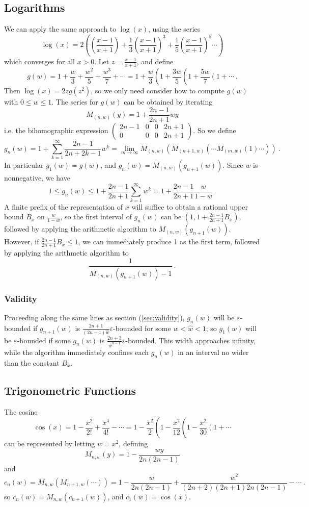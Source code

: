 \documentclass[11pt, oneside]{amsart}   	%
\newcommand{\bihomographic}[8]{\left(\begin{smallmatrix}#1&#2&#3&#4\\#5&#6&#7&#8\end{smallmatrix}\right)}
\renewcommand{\:}{\negthickspace:\negthickspace}
\begin{document}
\subsection{Logarithms} We can apply the same approach to $\log(x)$, using the series
\[
\log (x) =  2 \left( \left(\frac{x-1}{x+1}\right) + \frac{1}{3}\left(\frac{x-1}{x+1}\right)^3 + \frac{1}{5}\left(\frac{x-1}{x+1}\right)^5 \cdots \right)
\]
which converges for all $x > 0$. Let $z=\frac{x-1}{x+1}$, and define
\[
g(w) = 1 + \frac{w}{3} + \frac{w^2}{5} + \frac{w^3}{7} + \cdots = 1 + \frac{w}{3}\left(1 + \frac{3w}{5}\left(1 + \frac{5w}{7}\left(1 +\cdots \right. \right. \right.\ .
\]
Then $\log(x) = 2zg(z^2)$, so we only need consider how to compute $g(w)$ with $0 \leq w \leq 1$.
The series for $g(w)$ can be obtained by iterating
\[
M_{(n,w)}(y) = 1 + \frac{2n-1}{2n+1}wy 
\]
i.e. the bihomographic expression $\bihomographic{2n-1}{0}{0}{2n+1}{0}{0}{0}{2n+1}$.
So we define
\[
g_n(w) = 1  + \sum_{k=1}^{\infty}\frac{2n-1}{2n+2k-1}w^k= \lim_{m\to\infty} M_{(n,w)}( M_{(n+1,w)}( \cdots M_{(m,w)}(1) \cdots ) ) \ .
\]
In particular $g_1(w) = g(w)$, and $g_n(w) = M_{(n,w)}(g_{n+1}(w))$. Since $w$ is nonnegative, we have
\begin{equation}\label{eq:logbound}
1 \leq g_n(w) \leq 1 + \frac{2n-1}{2n+1}\sum_{k=1}^{\infty} w^k = 1+\frac{2n-1}{2n+1}\frac{w}{1-w}\ .
\end{equation}
A finite prefix of the representation of $x$ will suffice to obtain a rational upper bound $B_x$ on $\frac{w}{1-w}$, so the first interval of $g_n(w)$ can be $(1, 1+\frac{2n-1}{2n+1}B_x)$, followed by applying the arithmetic algorithm to $M_{(n,w)}(g_{n+1}(w))$. However, if $\frac{2n-1}{2n+1}B_x \leq 1$, we can immediately produce 1 as the first term, followed by applying the
arithmetic algorithm to
\[
\frac{1}{M_{(n,w)}(g_{n+1}(w)) - 1}\ .
\]

\subsubsection{Validity} Proceeding along the same lines as section (\ref{sec:validity}), $g_n(w)$ will be $\varepsilon$-bounded if
$g_{n+1}(w)$ is $\frac{2n+1}{(2n-1)\hat{w}}\varepsilon$-bounded for some $w < \hat{w} < 1$; so $g_1(w)$ will be $\varepsilon$-bounded if some $g_n(w)$ is
$\frac{2n+3}{\hat{w}^{n-1}}\varepsilon$-bounded. This width approaches infinity,
while the algorithm immediately confines each $g_n(w)$ in an interval no wider than the constant $B_x$.


\subsection{Trigonometric Functions}
The cosine
\[
\cos(x) = 1 - \frac{x^2}{2!} + \frac{x^4}{4!} - \cdots = 1 - \frac{x^2}{2} \left(1 - \frac{x^2}{12}\left( 1 - \frac{x^2}{30}\left(1 + \cdots \right. \right.  \right.  
\]
can be represented by letting $w=x^2$, defining
\[
M_{n,w}(y) = 1 - \frac{wy}{2n(2n-1)}
\]
and
\begin{equation}\label{eq:cosIter}
c_n(w) = M_{n,w}(M_{n+1,w}(\cdots)) = 1 - \frac{w}{2n(2n-1)} + \frac{w^2}{(2n+2)(2n+1)2n(2n-1)} - \cdots \ .
\end{equation}
so $c_n(w) = M_{n,w}(c_{n+1}(w))$, and $c_1(w) = \cos(x)$.
\end{document}
